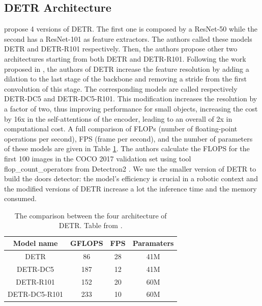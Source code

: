 \subsection{DETR Architecture}
\citeauthor{detr} \cite{detr} propose 4 versions of DETR. The first one is composed by a ResNet-50 while the second has a ResNet-101 as feature extractors. The authors called these models DETR and DETR-R101 respectively. Then, the authors propose other two architectures starting from both DETR and DETR-R101. Following the work proposed in \cite{fullyconvolutional}, the authors of DETR increase the feature resolution by
adding a dilation to the last stage of the backbone and removing a stride from
the first convolution of this stage. The corresponding models are called respectively DETR-DC5 and DETR-DC5-R101. This modification
increases the resolution by a factor of two, thus improving performance for small
objects, increasing the cost by 16x in the self-attentions of the encoder,
leading to an overall of 2x in computational cost. A full comparison of
FLOPs (number of floating-point operations per second), FPS (frame per second), and the number of parameters of these models are given in Table \ref{tab:detr_models_flops}. The authors calculate the FLOPS for the first 100 images in the COCO 2017 validation set using tool \textsf{flop\_count\_operators} from Detectron2 \cite{detectron2}. We use the smaller version of DETR to build the doors detector: the model's efficiency is crucial in a robotic context and the modified versions of DETR increase a lot the inference time and the memory consumed. 

\begin{table}[h!]
	\centering
	\begin{tabular}{cccc}
		
		\toprule
		\textbf{Model name} & \textbf{GFLOPS} & \textbf{FPS} & \textbf{Paramaters} \tabularnewline
		\midrule
		DETR & 86 & 28 & 41M\tabularnewline
		DETR-DC5 & 187 & 12 & 41M\tabularnewline
		DETR-R101 & 152 & 20 & 60M\tabularnewline
		DETR-DC5-R101 & 233 & 10 & 60M\tabularnewline
		\bottomrule
	\end{tabular}
	\caption{The comparison between the four architecture of DETR. Table from \cite{detr}.}
	\label{tab:detr_models_flops}
\end{table}

